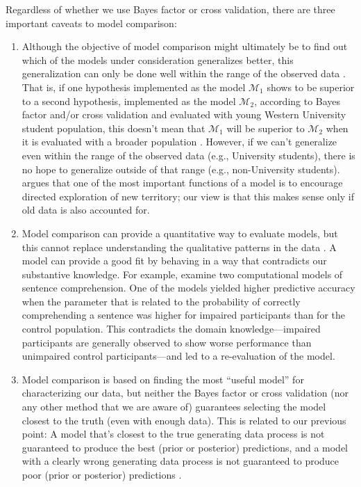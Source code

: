 \documentclass[12pt,]{krantz}
\theoremstyle{definition}
\theoremstyle{definition}
\theoremstyle{definition}
\theoremstyle{remark}
\begin{document}
Regardless of whether we use Bayes factor or cross validation, there are three important caveats to model comparison:

\begin{enumerate}
\def\labelenumi{\arabic{enumi}.}
\item
  Although the objective of model comparison might ultimately be to find out which of the models under consideration generalizes better, this generalization can only be done well within the range of the observed data \citep[see][]{VehtariLampinen2002, VehtariOjanen2012}. That is, if one hypothesis implemented as the model \(\mathcal{M}_1\) shows to be superior to a second hypothesis, implemented as the model \(\mathcal{M}_2\), according to Bayes factor and/or cross validation and evaluated with young Western University student population, this doesn't mean that \(\mathcal{M}_1\) will be superior to \(\mathcal{M}_2\) when it is evaluated with a broader population \citep[and in fact it seems that many times it won't, see][]{henrich_heine_norenzayan_2010}. However, if we can't generalize even within the range of the observed data (e.g., University students), there is no hope to generalize outside of that range (e.g., non-University students). \citet{navarroDevilDeepBlue2018} argues that one of the most important functions of a model is to encourage directed exploration of new territory; our view is that this makes sense only if old data is also accounted for.
\item
  Model comparison can provide a quantitative way to evaluate models, but this cannot replace understanding the qualitative patterns in the data \citep[see, e.g.,][]{navarroDevilDeepBlue2018}. A model can provide a good fit by behaving in a way that contradicts our substantive knowledge. For example, \citet{lisson_2020} examine two computational models of sentence comprehension. One of the models yielded higher predictive accuracy when the parameter that is related to the probability of correctly comprehending a sentence was higher for impaired participants than for the control population. This contradicts the domain knowledge---impaired participants are generally observed to show worse performance than unimpaired control participants---and led to a re-evaluation of the model.
\item
  Model comparison is based on finding the most ``useful model'' for characterizing our data, but neither the Bayes factor or cross validation (nor any other method that we are aware of) guarantees selecting the model closest to the truth (even with enough data). This is related to our previous point: A model that's closest to the true generating data process is not guaranteed to produce the best (prior or posterior) predictions, and a model with a clearly wrong generating data process is not guaranteed to produce poor (prior or posterior) predictions \citetext{\citealp[see][for an example with cross-validation]{WangGelman2014difficulty}; \citealp[and][ for a toy example with Bayes factor]{navarroDevilDeepBlue2018}}.
\end{enumerate}
\end{document}
